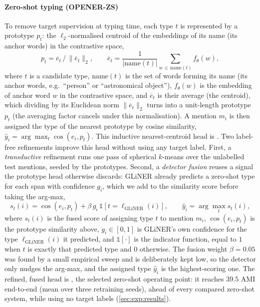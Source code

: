 \paragraph{Zero-shot typing (OPENER-ZS)}
To remove target supervision at typing time, each type $t$ is represented by a prototype $p_t$: the $\ell_2$-normalised centroid of the embeddings of its name (its anchor words) in the contrastive space,
\begin{equation}
p_t = \overline{e}_t\,\big/\,\lVert \overline{e}_t\rVert_2,\qquad \overline{e}_t=\frac{1}{|\mathrm{name}(t)|}\!\!\sum_{w\,\in\,\mathrm{name}(t)}\!\!f_\theta(w),
\end{equation}
where $t$ is a candidate type, $\mathrm{name}(t)$ is the set of words forming its name (its anchor words, e.g.\ ``person'' or ``astronomical object''), $f_\theta(w)$ is the embedding of anchor word $w$ in the contrastive space, and $\overline{e}_t$ is their average (the centroid), which dividing by its Euclidean norm $\lVert\overline{e}_t\rVert_2$ turns into a unit-length prototype $p_t$ (the averaging factor cancels under this normalisation). A mention $m_i$ is then assigned the type of the nearest prototype by cosine similarity, $\hat y_i = \arg\max_t \cos(e_i, p_t)$. This inductive nearest-centroid head is \zsind.
Two label-free refinements improve this head without using any target label.
First, a \emph{transductive} refinement runs one pass of spherical $k$-means over the unlabelled test mentions, seeded by the prototypes.
Second, a \emph{detector fusion} reuses a signal the prototype head otherwise discards: GLiNER already predicts a zero-shot type for each span with confidence $g_i$, which we add to the similarity score before taking the arg-max,
\begin{equation}
s_t(i)=\cos(e_i,p_t)+\beta\,g_i\,\mathbb{1}\!\left[t=\ell_{\text{GLiNER}}(i)\right],\qquad \hat y_i=\arg\max_t s_t(i),
\end{equation}
where $s_t(i)$ is the fused score of assigning type $t$ to mention $m_i$, $\cos(e_i,p_t)$ is the prototype similarity above, $g_i\in[0,1]$ is GLiNER's own confidence for the type $\ell_{\text{GLiNER}}(i)$ it predicted, and $\mathbb{1}[\cdot]$ is the indicator function, equal to $1$ when $t$ is exactly that predicted type and $0$ otherwise. The fusion weight $\beta{=}0.05$ was found by a small empirical sweep and is deliberately kept low, so the detector only nudges the arg-max, and the assigned type $\hat y_i$ is the highest-scoring one.
The refined, fused head is \zstr, the selected zero-shot operating point: it reaches $39.5$ AMI end-to-end (mean over three retraining seeds), ahead of every compared zero-shot system, while using no target labels (\autoref{sec:exp:results}).

